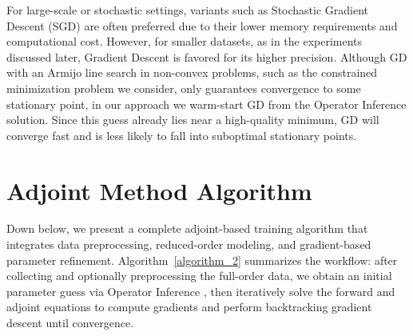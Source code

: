 For large-scale or stochastic settings, variants such as Stochastic Gradient Descent (SGD) are often preferred \cite{ruder2017overviewgradientdescentoptimization} due to their lower memory requirements and computational cost. However, for smaller datasets, as in the experiments discussed later, Gradient Descent is favored for its higher precision. Although GD with an Armijo line search in non-convex problems, such as the constrained minimization problem we consider, only guarantees convergence to some stationary point, in our approach we warm-start GD from the Operator Inference solution. Since this guess already lies near a high-quality minimum, GD will converge fast and is less likely to fall into suboptimal stationary points.



\section{Adjoint Method Algorithm}

Down below, we present a complete adjoint-based training algorithm that integrates data preprocessing, reduced-order modeling, and gradient-based parameter refinement. Algorithm~\ref{algorithm_2} summarizes the workflow: after collecting and optionally preprocessing the full-order data, we obtain an initial parameter guess via Operator Inference \cite{opinf2025}, then iteratively solve the forward and adjoint equations to compute gradients and perform backtracking gradient descent until convergence.

